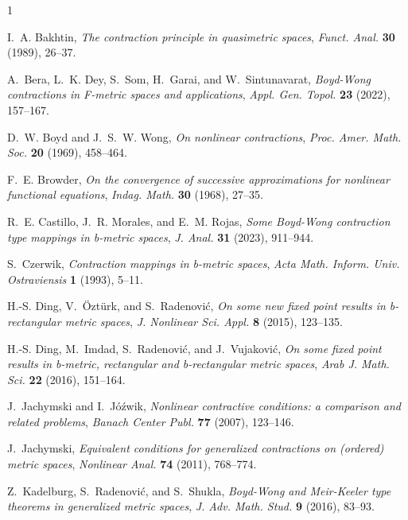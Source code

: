 \documentclass{birkjour}
\theoremstyle{definition}
\theoremstyle{remark}
\numberwithin{equation}{section}
\begin{document}
\begin{thebibliography}{1}

I.~A. Bakhtin,
\textit{The contraction principle in quasimetric spaces},
\textit{Funct. Anal.} \textbf{30} (1989), 26--37.

A.~Bera, L.~K. Dey, S.~Som, H.~Garai, and W.~Sintunavarat,
\textit{Boyd-Wong contractions in F-metric spaces and applications},
\textit{Appl. Gen. Topol.} \textbf{23} (2022), 157--167.

D.~W. Boyd and J.~S.~W. Wong,
\textit{On nonlinear contractions},
\textit{Proc. Amer. Math. Soc.} \textbf{20} (1969), 458--464.

F.~E. Browder,
\textit{On the convergence of successive approximations for nonlinear functional equations},
\textit{Indag. Math.} \textbf{30} (1968), 27--35.

R.~E. Castillo, J.~R. Morales, and E.~M. Rojas,
\textit{Some Boyd-Wong contraction type mappings in b-metric spaces},
\textit{J. Anal.} \textbf{31} (2023), 911--944.

S.~Czerwik,
\textit{Contraction mappings in b-metric spaces},
\textit{Acta Math. Inform. Univ. Ostraviensis} \textbf{1} (1993), 5--11.

H.-S. Ding, V.~\"{O}zt\"{u}rk, and S.~Radenovi\'{c},
\textit{On some new fixed point results in b-rectangular metric spaces},
\textit{J. Nonlinear Sci. Appl.} \textbf{8} (2015), 123--135. %

H.-S. Ding, M.~Imdad, S.~Radenovi\'{c}, and J.~Vujakovi\'{c},
\textit{On some fixed point results in b-metric, rectangular and b-rectangular metric spaces},
\textit{Arab J. Math. Sci.} \textbf{22} (2016), 151--164.

J.~Jachymski and I.~J\'{o}\'{z}wik,
\textit{Nonlinear contractive conditions: a comparison and related problems},
\textit{Banach Center Publ.} \textbf{77} (2007), 123--146.

J.~Jachymski,
\textit{Equivalent conditions for generalized contractions on (ordered) metric spaces},
\textit{Nonlinear Anal.} \textbf{74} (2011), 768--774.

Z.~Kadelburg, S.~Radenovi\'{c}, and S.~Shukla,
\textit{Boyd-Wong and Meir-Keeler type theorems in generalized metric spaces},
\textit{J. Adv. Math. Stud.} \textbf{9} (2016), 83--93.


\end{thebibliography}
\end{document}
